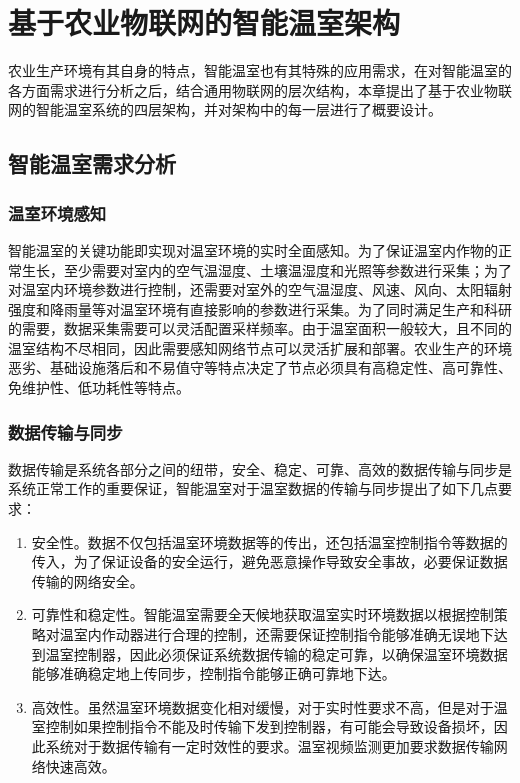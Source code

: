 
\chapter{基于农业物联网的智能温室架构}
\label{chapter:IoT Architecture}
农业生产环境有其自身的特点，智能温室也有其特殊的应用需求，在对智能温室的各方面需求进行分析之后，结合通用物联网的层次结构，本章提出了基于农业物联网的智能温室系统的四层架构，并对架构中的每一层进行了概要设计。

\section{智能温室需求分析}
	\subsection{温室环境感知}
智能温室的关键功能即实现对温室环境的实时全面感知。为了保证温室内作物的正常生长，至少需要对室内的空气温湿度、土壤温湿度和光照等参数进行采集\supercite{ZhouTao2015}；为了对温室内环境参数进行控制，还需要对室外的空气温湿度、风速、风向、太阳辐射强度和降雨量等对温室环境有直接影响的参数进行采集。为了同时满足生产和科研的需要，数据采集需要可以灵活配置采样频率。由于温室面积一般较大，且不同的温室结构不尽相同，因此需要感知网络节点可以灵活扩展和部署。农业生产的环境恶劣、基础设施落后和不易值守等特点决定了节点必须具有高稳定性、高可靠性、免维护性、低功耗性等特点。
	\subsection{数据传输与同步}
数据传输是系统各部分之间的纽带，安全、稳定、可靠、高效的数据传输与同步是系统正常工作的重要保证，智能温室对于温室数据的传输与同步提出了如下几点要求：
		\begin{enumerate}
			\item 安全性。数据不仅包括温室环境数据等的传出，还包括温室控制指令等数据的传入，为了保证设备的安全运行，避免恶意操作导致安全事故，必要保证数据传输的网络安全。
			\item 可靠性和稳定性。智能温室需要全天候地获取温室实时环境数据以根据控制策略对温室内作动器进行合理的控制，还需要保证控制指令能够准确无误地下达到温室控制器，因此必须保证系统数据传输的稳定可靠，以确保温室环境数据能够准确稳定地上传同步，控制指令能够正确可靠地下达。
			\item 高效性。虽然温室环境数据变化相对缓慢，对于实时性要求不高，但是对于温室控制如果控制指令不能及时传输下发到控制器，有可能会导致设备损坏，因此系统对于数据传输有一定时效性的要求。温室视频监测更加要求数据传输网络快速高效。	
		\end{enumerate}

